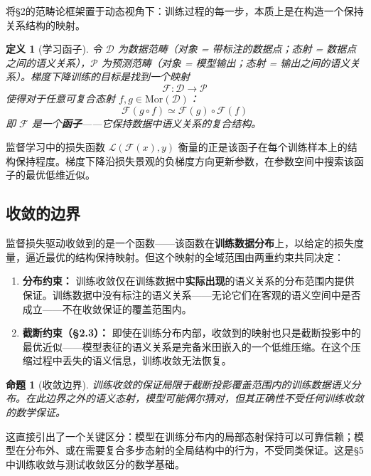 \documentclass[11pt,a4paper]{ctexart}
\newtheorem{proposition}[theorem]{命题}
\newtheorem{definition}[theorem]{定义}
\begin{document}
将§2的范畴论框架置于动态视角下：训练过程的每一步，本质上是在构造一个保持关系结构的映射。

\begin{definition}[学习函子]
    令 $\mathcal{D}$ 为数据范畴（对象 = 带标注的数据点；态射 = 数据点之间的语义关系），$\mathcal{P}$ 为预测范畴（对象 = 模型输出；态射 = 输出之间的语义关系）。梯度下降训练的目标是找到一个映射
    \begin{equation}
        \mathcal{F}: \mathcal{D} \longrightarrow \mathcal{P}
    \end{equation}
    使得对于任意可复合态射 $f, g \in \mathrm{Mor}(\mathcal{D})$：
    \begin{equation}
        \mathcal{F}(g \circ f) \simeq \mathcal{F}(g) \circ \mathcal{F}(f)
    \end{equation}
    即 $\mathcal{F}$ 是一个\textbf{函子}——它保持数据中语义关系的复合结构。
\end{definition}

监督学习中的损失函数 $\mathcal{L}(\mathcal{F}(x), y)$ 衡量的正是该函子在每个训练样本上的结构保持程度。梯度下降沿损失景观的负梯度方向更新参数，在参数空间中搜索该函子的最优低维近似。

\subsection{收敛的边界}

监督损失驱动收敛到的是一个函数——该函数在\textbf{训练数据分布}上，以给定的损失度量，逼近最优的结构保持映射。但这个映射的全域范围由两重约束共同决定：

\begin{enumerate}[leftmargin=*]
    \item \textbf{分布约束：} 训练收敛仅在训练数据中\textbf{实际出现}的语义关系的分布范围内提供保证。训练数据中没有标注的语义关系——无论它们在客观的语义空间中是否成立——不在收敛保证的覆盖范围内。
    \item \textbf{截断约束（§2.3）：} 即使在训练分布内部，收敛到的映射也只是截断投影中的最优近似——模型表征的语义关系是完备米田嵌入的一个低维压缩。在这个压缩过程中丢失的语义信息，训练收敛无法恢复。
\end{enumerate}

\begin{proposition}[收敛边界]
    训练收敛的保证局限于截断投影覆盖范围内的训练数据语义分布。在此边界之外的语义态射，模型可能偶尔猜对，但其正确性不受任何训练收敛的数学保证。
\end{proposition}

这直接引出了一个关键区分：模型在训练分布内的局部态射保持可以可靠信赖；模型在分布外、或在需要复合多步态射的全局结构中的行为，不受同类保证。这是§5中训练收敛与测试收敛区分的数学基础。
\end{document}
